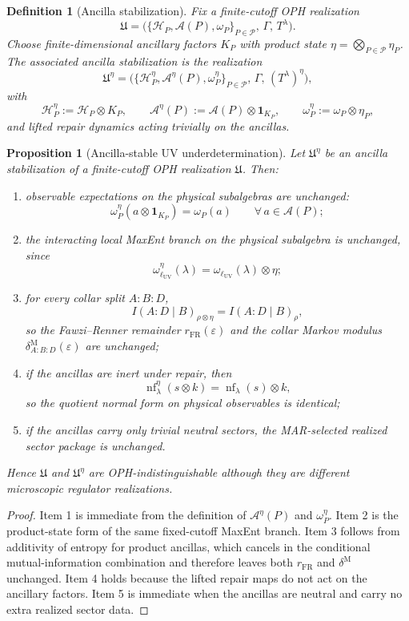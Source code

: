 \documentclass[11pt]{article}
\newtheorem{proposition}[theorem]{Proposition}
\newtheorem{definition}[theorem]{Definition}
\newcommand{\nf}{\operatorname{nf}}
\begin{document}
\begin{definition}[Ancilla stabilization]\label{def:ancillastab}
Fix a finite-cutoff OPH realization
\[
\mathfrak U=
\bigl(\{\mathcal H_P,\mathcal A(P),\omega_P\}_{P\in\mathcal P},\,\Gamma,\,T^\lambda\bigr).
\]
Choose finite-dimensional ancillary factors \(K_P\) with product state \(\eta=\bigotimes_{P\in\mathcal P}\eta_P\). The associated ancilla stabilization is the realization
\[
\mathfrak U^\eta=
\bigl(\{\mathcal H_P^\eta,\mathcal A^\eta(P),\omega_P^\eta\}_{P\in\mathcal P},\,\Gamma,\,(T^\lambda)^\eta\bigr),
\]
with
\[
\mathcal H_P^\eta:=\mathcal H_P\otimes K_P,\qquad
\mathcal A^\eta(P):=\mathcal A(P)\otimes \mathbf 1_{K_P},\qquad
\omega_P^\eta:=\omega_P\otimes \eta_P,
\]
and lifted repair dynamics acting trivially on the ancillas.
\end{definition}

\begin{proposition}[Ancilla-stable UV underdetermination]\label{prop:ancillauv}
Let \(\mathfrak U^\eta\) be an ancilla stabilization of a finite-cutoff OPH realization \(\mathfrak U\). Then:
\begin{enumerate}[leftmargin=2em]
\item observable expectations on the physical subalgebras are unchanged:
\[
\omega_P^\eta(a\otimes \mathbf 1_{K_P})=\omega_P(a)
\qquad
\forall\, a\in\mathcal A(P);
\]
\item the interacting local MaxEnt branch on the physical subalgebra is unchanged, since
\[
\omega_{\ell_{\mathrm{UV}}}^\eta(\lambda)=\omega_{\ell_{\mathrm{UV}}}(\lambda)\otimes \eta;
\]
\item for every collar split \(A:B:D\),
\[
I(A:D\mid B)_{\rho\otimes \eta}=I(A:D\mid B)_\rho,
\]
so the Fawzi--Renner remainder \(r_{\mathrm{FR}}(\varepsilon)\) and the collar Markov modulus \(\delta^{\mathrm M}_{A:B:D}(\varepsilon)\) are unchanged;
\item if the ancillas are inert under repair, then
\[
\nf_\lambda^\eta(s\otimes k)=\nf_\lambda(s)\otimes k,
\]
so the quotient normal form on physical observables is identical;
\item if the ancillas carry only trivial neutral sectors, the MAR-selected realized sector package is unchanged.
\end{enumerate}
Hence \(\mathfrak U\) and \(\mathfrak U^\eta\) are OPH-indistinguishable although they are different microscopic regulator realizations.
\end{proposition}

\begin{proof}
Item 1 is immediate from the definition of \(\mathcal A^\eta(P)\) and \(\omega_P^\eta\). Item 2 is the product-state form of the same fixed-cutoff MaxEnt branch. Item 3 follows from additivity of entropy for product ancillas, which cancels in the conditional mutual-information combination and therefore leaves both \(r_{\mathrm{FR}}\) and \(\delta^{\mathrm M}\) unchanged. Item 4 holds because the lifted repair maps do not act on the ancillary factors. Item 5 is immediate when the ancillas are neutral and carry no extra realized sector data.
\end{proof}
\end{document}
